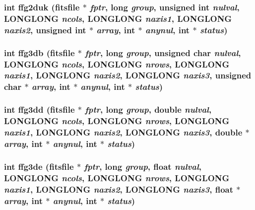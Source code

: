 \subsubsection{\setlength{\rightskip}{0pt plus 5cm}int ffg2duk (\bf{fitsfile} $\ast$ {\em fptr}, long {\em group}, unsigned int {\em nulval}, \bf{LONGLONG} {\em ncols}, \bf{LONGLONG} {\em naxis1}, \bf{LONGLONG} {\em naxis2}, unsigned int $\ast$ {\em array}, int $\ast$ {\em anynul}, int $\ast$ {\em status})}\label{fitsio_8h_c6647602cdca43baba09deb777b5dcd4}


\subsubsection{\setlength{\rightskip}{0pt plus 5cm}int ffg3db (\bf{fitsfile} $\ast$ {\em fptr}, long {\em group}, unsigned char {\em nulval}, \bf{LONGLONG} {\em ncols}, \bf{LONGLONG} {\em nrows}, \bf{LONGLONG} {\em naxis1}, \bf{LONGLONG} {\em naxis2}, \bf{LONGLONG} {\em naxis3}, unsigned char $\ast$ {\em array}, int $\ast$ {\em anynul}, int $\ast$ {\em status})}\label{fitsio_8h_9582d214eee6caff5f012349cd686953}


\subsubsection{\setlength{\rightskip}{0pt plus 5cm}int ffg3dd (\bf{fitsfile} $\ast$ {\em fptr}, long {\em group}, double {\em nulval}, \bf{LONGLONG} {\em ncols}, \bf{LONGLONG} {\em nrows}, \bf{LONGLONG} {\em naxis1}, \bf{LONGLONG} {\em naxis2}, \bf{LONGLONG} {\em naxis3}, double $\ast$ {\em array}, int $\ast$ {\em anynul}, int $\ast$ {\em status})}\label{fitsio_8h_118dc24914a4d05af2d47290a4a608a6}


\subsubsection{\setlength{\rightskip}{0pt plus 5cm}int ffg3de (\bf{fitsfile} $\ast$ {\em fptr}, long {\em group}, float {\em nulval}, \bf{LONGLONG} {\em ncols}, \bf{LONGLONG} {\em nrows}, \bf{LONGLONG} {\em naxis1}, \bf{LONGLONG} {\em naxis2}, \bf{LONGLONG} {\em naxis3}, float $\ast$ {\em array}, int $\ast$ {\em anynul}, int $\ast$ {\em status})}\label{fitsio_8h_5848c6f1a0ec2bdbb3c7cc460438eaf5}


